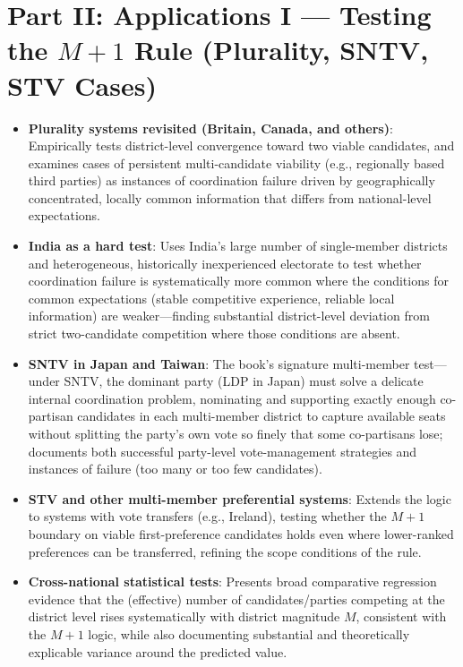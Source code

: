 \documentclass[12pt]{article}
\begin{document}
\section{Part II: Applications I --- Testing the $M+1$ Rule (Plurality, SNTV, STV Cases)}

\begin{itemize}[leftmargin=*, itemsep=4pt]
    \item \textbf{Plurality systems revisited (Britain, Canada, and others)}: Empirically tests district-level convergence toward two viable candidates, and examines cases of persistent multi-candidate viability (e.g., regionally based third parties) as instances of coordination failure driven by geographically concentrated, locally common information that differs from national-level expectations.
    \item \textbf{India as a hard test}: Uses India's large number of single-member districts and heterogeneous, historically inexperienced electorate to test whether coordination failure is systematically more common where the conditions for common expectations (stable competitive experience, reliable local information) are weaker---finding substantial district-level deviation from strict two-candidate competition where those conditions are absent.
    \item \textbf{SNTV in Japan and Taiwan}: The book's signature multi-member test---under SNTV, the dominant party (LDP in Japan) must solve a delicate internal coordination problem, nominating and supporting exactly enough co-partisan candidates in each multi-member district to capture available seats without splitting the party's own vote so finely that some co-partisans lose; documents both successful party-level vote-management strategies and instances of failure (too many or too few candidates).
    \item \textbf{STV and other multi-member preferential systems}: Extends the logic to systems with vote transfers (e.g., Ireland), testing whether the $M+1$ boundary on viable first-preference candidates holds even where lower-ranked preferences can be transferred, refining the scope conditions of the rule.
    \item \textbf{Cross-national statistical tests}: Presents broad comparative regression evidence that the (effective) number of candidates/parties competing at the district level rises systematically with district magnitude $M$, consistent with the $M+1$ logic, while also documenting substantial and theoretically explicable variance around the predicted value.
\end{itemize}
\end{document}
